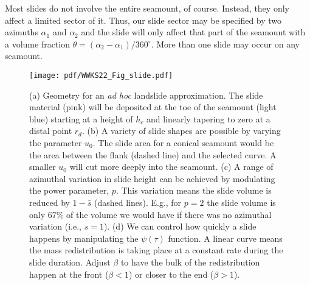 Most slides do not involve the entire seamount, of course. Instead, they only affect a limited sector of it.
Thus, our slide sector may be specified by two azimuths $\alpha_1$ and $\alpha_2$ and the slide will only affect
that part of the seamount with a volume fraction $\theta = (\alpha_2 - \alpha_1)/360^{\circ}$.  More than one slide may
occur on any seamount.

\begin{figure}[H]
\centering
\texttt{[image: pdf/WWKS22\_Fig\_slide.pdf]}
\caption{(a) Geometry for an \emph{ad hoc} landslide approximation.  The slide material (pink)
  will be deposited at the toe of the seamount (light blue) starting at a height of $h_c$ and linearly
  tapering to zero at a distal point $r_d$.
  (b) A variety of slide shapes are possible by varying the parameter $u_0$.  The slide area for a conical seamount
  would be the area between the flank (dashed line) and the selected curve. A smaller $u_0$ will cut more deeply
  into the seamount.
  (c) A range of azimuthal variation in slide height can be achieved by modulating the power parameter, $p$.
  This variation means the slide volume is reduced by $1 - \bar{s}$ (dashed lines). E.g., for $p = 2$ the slide
  volume is only 67\% of the volume we would have if there was no azimuthal variation (i.e., $s = 1$).
  (d) We can control how quickly a slide happens by manipulating the $\psi(\tau)$ function. A
  linear curve means the mass redistribution is taking place at a constant rate during the slide duration.
  Adjust $\beta$ to have the bulk of the redistribution happen at the front ($\beta < 1$) or closer
  to the end ($\beta > 1$).}
\label{WWKS22_Fig_slide}
\end{figure}

